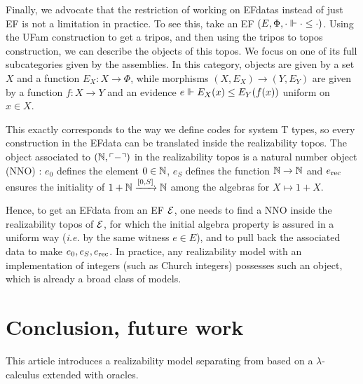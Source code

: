 \documentclass[a4paper,UKenglish,cleveref, autoref, thm-restate]{lipics-v2021}
\begin{document}
Finally, we advocate that the restriction of working on EFdatas instead of just EF is not a limitation in practice.
To see this, take an EF $(E,\Phi,\cdot \Vdash \cdot \leq \cdot)$. Using the UFam construction \cite{CohMiqTat21,JacobsCLTT} to get a tripos, and then using the tripos to topos construction, we can describe the objects of this topos. We focus on one of its full subcategories given by the assemblies. In this category, objects are given by a set $X$ and a function $E_X : X \to \Phi$,
while morphisms $(X,E_X) \to (Y,E_Y)$ are given by a function $f : X \to Y$ and an evidence $e \Vdash E_X(x) \leq E_Y(f(x))$ uniform on $x \in X$.

This exactly corresponds to the way we define codes for system T types, so every construction in the EFdata can be translated inside the realizability topos. The object associated to $(\mathbb N,\ulcorner-\urcorner)$ in the realizability topos is a natural number object (NNO) \cite{Lawvere1963}: $e_0$ defines the element $0 \in \mathbb N$, $e_S$ defines the function $\mathbb N \to \mathbb N$ and $e_{\mathrm{rec}}$ ensures the initiality of $1+\mathbb N \xrightarrow{[0,S]} \mathbb N$ among the algebras for $X\mapsto 1+X$.


Hence, to get an EFdata from an EF $\mathcal{E}$, one needs to find a NNO inside the realizability topos of $\mathcal{E}$, for which the initial algebra property is assured in a uniform way (\textit{i.e.} by the same witness $e \in E$), and to pull back the associated data to make $e_0,e_S,e_{\mathrm{rec}}$. In practice, any realizability model with an implementation of integers (such as Church integers) possesses such an object, which is already a broad class of models.


\section{Conclusion, future work}

This article introduces a realizability model separating \FT from \WKL
based on a $\lambda$-calculus extended with oracles.
\end{document}
